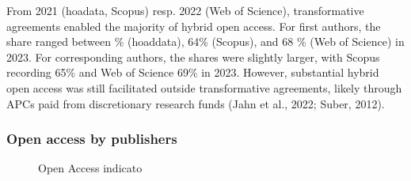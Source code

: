 \documentclass[a4paper,man,floatsintext,longtable,noextraspace,10pt]{apa6}
\begin{document}
From 2021 (hoadata, Scopus) resp. 2022 (Web of Science), transformative
agreements enabled the majority of hybrid open access. For first
authors, the share ranged between \% (hoaddata), 64\% (Scopus), and 68
\% (Web of Science) in 2023. For corresponding authors, the shares were
slightly larger, with Scopus recording 65\% and Web of Science 69\% in
2023. However, substantial hybrid open access was still facilitated
outside transformative agreements, likely through APCs paid from
discretionary research funds (Jahn et al., 2022; Suber, 2012).

\subsubsection{Open access by
publishers}\label{open-access-by-publishers}

\begin{figure}[ht!]


\caption{\label{fig-uptake_publisher}Open Access indicato}

\end{figure}%
\end{document}
